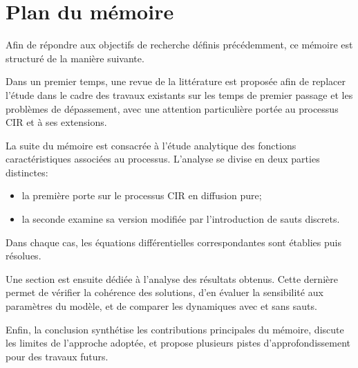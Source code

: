 \section{Plan du mémoire}  %
Afin de répondre aux objectifs de recherche définis précédemment, ce mémoire est structuré de la manière suivante.

Dans un premier temps, une revue de la littérature est proposée afin de replacer l'étude dans le cadre des travaux existants sur les temps de premier passage et les problèmes de dépassement, avec une attention particulière portée au processus \acs{CIR} et à ses extensions.

La suite du mémoire est consacrée à l'étude analytique des fonctions caractéristiques associées au processus. L'analyse se divise en deux parties distinctes: 
\begin{itemize}
    \item la première porte sur le processus \acs{CIR} en diffusion pure;
    \item la seconde examine sa version modifiée par l'introduction de sauts discrets.
\end{itemize}
Dans chaque cas, les équations différentielles correspondantes sont établies puis résolues.

Une section est ensuite dédiée à l'analyse des résultats obtenus. Cette dernière permet de vérifier la cohérence des solutions, d'en évaluer la sensibilité aux paramètres du modèle, et de comparer les dynamiques avec et sans sauts.

Enfin, la conclusion synthétise les contributions principales du mémoire, discute les limites de l'approche adoptée, et propose plusieurs pistes d'approfondissement pour des travaux futurs.

